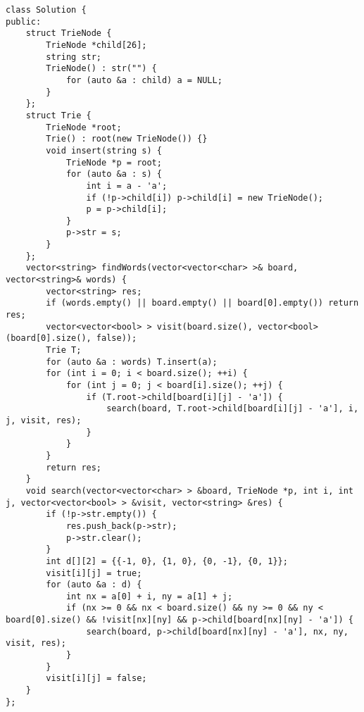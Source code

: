 \begin{lstlisting}
class Solution {
public:
    struct TrieNode {
        TrieNode *child[26];
        string str;
        TrieNode() : str("") {
            for (auto &a : child) a = NULL;
        }
    };
    struct Trie {
        TrieNode *root;
        Trie() : root(new TrieNode()) {}
        void insert(string s) {
            TrieNode *p = root;
            for (auto &a : s) {
                int i = a - 'a';
                if (!p->child[i]) p->child[i] = new TrieNode();
                p = p->child[i];
            }
            p->str = s;
        }
    };
    vector<string> findWords(vector<vector<char> >& board, vector<string>& words) {
        vector<string> res;
        if (words.empty() || board.empty() || board[0].empty()) return res;
        vector<vector<bool> > visit(board.size(), vector<bool>(board[0].size(), false));
        Trie T;
        for (auto &a : words) T.insert(a);
        for (int i = 0; i < board.size(); ++i) {
            for (int j = 0; j < board[i].size(); ++j) {
                if (T.root->child[board[i][j] - 'a']) {
                    search(board, T.root->child[board[i][j] - 'a'], i, j, visit, res);
                }
            }
        }
        return res;
    }
    void search(vector<vector<char> > &board, TrieNode *p, int i, int j, vector<vector<bool> > &visit, vector<string> &res) { 
        if (!p->str.empty()) {
            res.push_back(p->str);
            p->str.clear();
        }
        int d[][2] = {{-1, 0}, {1, 0}, {0, -1}, {0, 1}};
        visit[i][j] = true;
        for (auto &a : d) {
            int nx = a[0] + i, ny = a[1] + j;
            if (nx >= 0 && nx < board.size() && ny >= 0 && ny < board[0].size() && !visit[nx][ny] && p->child[board[nx][ny] - 'a']) {
                search(board, p->child[board[nx][ny] - 'a'], nx, ny, visit, res);
            }
        }
        visit[i][j] = false;
    }
};
\end{lstlisting}








